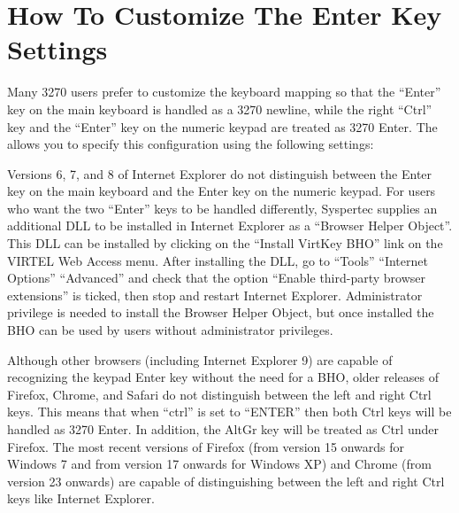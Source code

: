 \documentclass[letterpaper,10pt,english]{sphinxmanual}
\begin{document}
\section{How To Customize The Enter Key Settings}
\label{\detokenize{User_Guide:how-to-customize-the-enter-key-settings}}
Many 3270 users prefer to customize the keyboard mapping so that the “Enter” key on the main keyboard is handled
as a 3270 newline, while the right “Ctrl” key and the “Enter” key on the numeric keypad are treated as 3270 Enter.
The {\hyperref[\detokenize{User_Guide:v457ug-settings-menu}]{}} allows you to specify this configuration using the following settings:

\begin{sphinxVerbatim}[commandchars=\\\{\}]
\end{sphinxVerbatim}

Versions 6, 7, and 8 of Internet Explorer do not distinguish between the Enter key on the main keyboard and the Enter key on the numeric keypad. For users who want the two “Enter” keys to be handled differently, Syspertec supplies an additional DLL to be installed in Internet Explorer as a “Browser Helper Object”. This DLL can be installed by clicking on the “Install VirtKey BHO” link on the VIRTEL Web Access menu. After installing the DLL, go to “Tools” \textendash{} “Internet Options” \textendash{} “Advanced” and check that the option “Enable third-party browser extensions” is ticked, then stop and restart Internet Explorer. Administrator privilege is needed to install the Browser Helper Object, but once installed the BHO can be used by users without administrator privileges.

Although other browsers (including Internet Explorer 9) are capable of recognizing the keypad Enter key without the
need for a BHO, older releases of Firefox, Chrome, and Safari do not distinguish between the left and right Ctrl keys.
This means that when “ctrl” is set to “ENTER” then both Ctrl keys will be handled as 3270 Enter. In addition, the AltGr
key will be treated as Ctrl under Firefox. The most recent versions of Firefox (from version 15 onwards for Windows 7
and from version 17 onwards for Windows XP) and Chrome (from version 23 onwards) are capable of distinguishing
between the left and right Ctrl keys like Internet Explorer.
\end{document}
